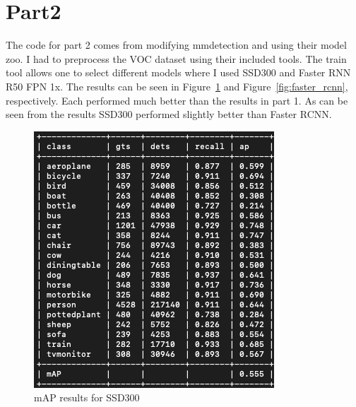 \documentclass{article}
\begin{document}
\section{Part2}
The code for part 2 comes from modifying mmdetection and using their model zoo.
I had to preprocess the VOC dataset using their included tools. The train tool
allows one to select different models where I used SSD300 and Faster RNN R50 FPN
1x. The results can be seen in Figure~\ref{fig:ssd} and
Figure~\ref{fig:faster_rcnn}, respectively. Each performed much better than the
results in part 1. As can be seen from the results SSD300 performed slightly
better than Faster RCNN.

\begin{figure}
\centering
\includegraphics[width=\textwidth]{ssd300_voc07.png}
\caption{mAP results for SSD300}
\label{fig:ssd}
\end{figure}
\end{document}
